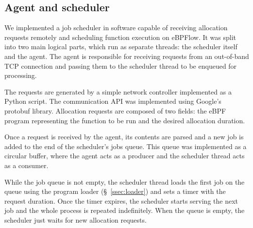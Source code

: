 \color{black}
\subsection{Agent and scheduler}

We implemented a job scheduler in software capable of receiving allocation requests remotely and scheduling function execution on eBPFlow. It was split into two main logical parts, which run as separate threads: the scheduler itself and the agent. The agent is responsible for receiving requests from an out-of-band TCP connection and passing them to the scheduler thread to be enqueued for processing. 

The requests are generated by a simple network controller implemented as a Python script. The communication API was implemented using Google's protobuf library. Allocation requests are composed of two fields: the eBPF program representing the function to be run and the desired allocation duration.

Once a request is received by the agent, its contents are parsed and a new job is added to the end of the scheduler's jobs queue. This queue was implemented as a circular buffer, where the agent acts as a producer and the scheduler thread acts as a consumer.

While the job queue is not empty, the scheduler thread loads the first job on the queue using the program loader (\S~\ref{ssec:loader}) and sets a timer with the request duration. Once the timer expires, the scheduler starts serving the next job and the whole process is repeated indefinitely. When the queue is empty, the scheduler just waits for new allocation requests.
\color{black}



